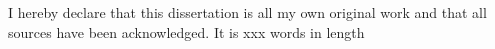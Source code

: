 \begin{declaration}

I hereby declare that this dissertation is all my own original work and that all sources have been acknowledged. It is xxx words in length

\end{declaration}
